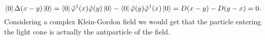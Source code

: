 \begin{equation*}
    \bra{0}\Delta(x-y)\ket{0}=\bra{0}\hat\varphi^\dagger(x)\hat\varphi(y)\ket{0}-\bra{0}\hat\varphi(y)\hat\varphi^\dagger(x)\ket{0}=D(x-y)-D(y-x)=0.
\end{equation*}
Considering a complex Klein-Gordon field we would get that the particle entering the light cone is actually the antiparticle of the field.

